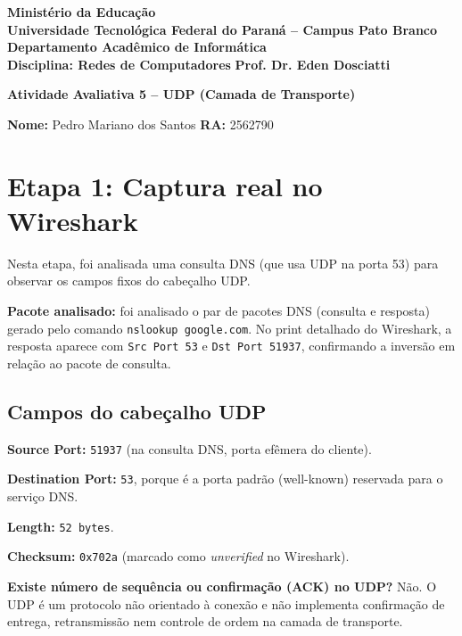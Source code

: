 \documentclass[12pt,a4paper]{article}
\begin{document}
\begin{center}
\textbf{Ministério da Educação}\\
\textbf{Universidade Tecnológica Federal do Paraná -- Campus Pato Branco}\\
\textbf{Departamento Acadêmico de Informática}\\[0.5em]
\textbf{Disciplina: Redes de Computadores} \hfill \textbf{Prof. Dr. Eden Dosciatti}

\vspace{1.2em}
\Large\textbf{Atividade Avaliativa 5 -- UDP (Camada de Transporte)}
\end{center}

\vspace{1em}
\noindent\textbf{Nome:} Pedro Mariano dos Santos \hfill \textbf{RA:} 2562790

\vspace{1em}

\section*{Etapa 1: Captura real no Wireshark}

Nesta etapa, foi analisada uma consulta DNS (que usa UDP na porta 53) para observar os campos fixos do cabeçalho UDP.

\textbf{Pacote analisado:} foi analisado o par de pacotes DNS (consulta e resposta) gerado pelo comando \texttt{nslookup google.com}. No print detalhado do Wireshark, a resposta aparece com \texttt{Src Port 53} e \texttt{Dst Port 51937}, confirmando a inversão em relação ao pacote de consulta.

\subsection*{Campos do cabeçalho UDP}

\textbf{Source Port:} \texttt{51937} (na consulta DNS, porta efêmera do cliente).

\textbf{Destination Port:} \texttt{53}, porque é a porta padrão (well-known) reservada para o serviço DNS.

\textbf{Length:} \texttt{52 bytes}.

\textbf{Checksum:} \texttt{0x702a} (marcado como \textit{unverified} no Wireshark).

\textbf{Existe número de sequência ou confirmação (ACK) no UDP?}
Não. O UDP é um protocolo não orientado à conexão e não implementa confirmação de entrega, retransmissão nem controle de ordem na camada de transporte.
\end{document}
